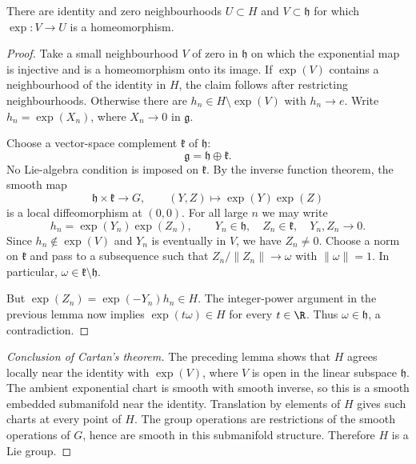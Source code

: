 \begin{lemma}
There are identity and zero neighbourhoods $U\subset H$ and
$V\subset\mathfrak h$ for which $\exp:V\to U$ is a homeomorphism.
\end{lemma}
\begin{proof}
Take a small neighbourhood $V$ of zero in $\mathfrak h$ on which the
exponential map is injective and is a homeomorphism onto its image.
If $\exp(V)$ contains a neighbourhood of the identity in $H$, the claim
follows after restricting neighbourhoods. Otherwise there are
$h_n\in H\setminus\exp(V)$ with $h_n\to e$. Write
$h_n=\exp(X_n)$, where $X_n\to0$ in $\mathfrak g$.

Choose a vector-space complement $\mathfrak k$ of $\mathfrak h$:
\[
 \mathfrak g=\mathfrak h\oplus\mathfrak k.
\]
No Lie-algebra condition is imposed on $\mathfrak k$. By the inverse
function theorem, the smooth map
\[
 \mathfrak h\times\mathfrak k\longrightarrow G,
 \qquad(Y,Z)\longmapsto\exp(Y)\exp(Z)
\]
is a local diffeomorphism at $(0,0)$. For all large $n$ we may write
\[
 h_n=\exp(Y_n)\exp(Z_n),\qquad
 Y_n\in\mathfrak h,\quad Z_n\in\mathfrak k,\quad Y_n,Z_n\to0.
\]
Since $h_n\notin\exp(V)$ and $Y_n$ is eventually in $V$, we have $Z_n\ne0$.
Choose a norm on $\mathfrak k$ and pass to a subsequence such that
$Z_n/\|Z_n\|\to\omega$ with $\|\omega\|=1$. In particular,
$\omega\in\mathfrak k\setminus\mathfrak h$.

But $\exp(Z_n)=\exp(-Y_n)h_n\in H$. The integer-power argument in the
previous lemma now implies $\exp(t\omega)\in H$ for every $t\in\R$.
Thus $\omega\in\mathfrak h$, a contradiction.
\end{proof}

\begin{proof}[Conclusion of Cartan's theorem]
The preceding lemma shows that $H$ agrees locally near the identity with
$\exp(V)$, where $V$ is open in the linear subspace $\mathfrak h$.
The ambient exponential chart is smooth with smooth inverse, so this is
a smooth embedded submanifold near the identity. Translation by elements
of $H$ gives such charts at every point of $H$. The group operations are
restrictions of the smooth operations of $G$, hence are smooth in this
submanifold structure. Therefore $H$ is a Lie group.
\end{proof}
